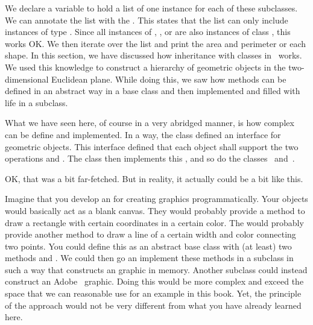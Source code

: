 We declare a variable  to hold a list of one instance for each of these subclasses.
We can annotate the list with the  .
This  states that the list can only include instances of type .
Since all instances of , , or  are also instances of class , this works OK.
We then iterate over the list and print the area and perimeter or each shape.%
\endhsection%
%
%
In this section, we have discussed how inheritance with classes in \python\ works.
We used this knowledge to construct a hierarchy of geometric objects in the two-dimensional Euclidean plane.
While doing this, we saw how methods can be defined in an abstract way in a base class and then implemented and filled with life in a subclass.

What we have seen here, of course in a very abridged manner, is how complex  can be define and implemented.
In a way, the class  defined an interface for geometric objects.
This interface defined that each object shall support the two operations  and .
The class  then implements this , and so do the classes~ and~.

OK, that was a bit far-fetched.
But in reality, it actually could be a bit like this.

Imagine that you develop an  for creating graphics programmatically.
Your objects would basically act as a blank canvas.
They would probably provide a method to draw a rectangle with certain coordinates in a certain color.
The would probably provide another method to draw a line of a certain width and color connecting two points.
You could define this as an abstract base class with (at least) two methods  and .
We could then go an implement these methods in a subclass in such a way that constructs an  graphic in memory.
Another subclass could instead construct an Adobe~ graphic.
Doing this would be more complex and exceed the space that we can reasonable use for an example in this book.
Yet, the principle of the approach would not be very different from what you have already learned here.%
\endhsection%
%
\FloatBarrier%
\endhsection%
